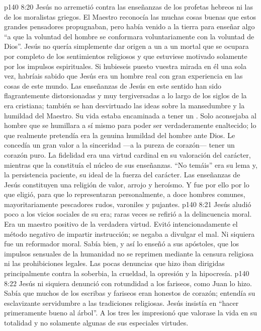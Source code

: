 \vs p140 8:20 Jesús no arremetió contra las enseñanzas de los profetas hebreos ni las de los moralistas griegos. El Maestro reconocía las muchas cosas buenas que estos grandes pensadores propugnaban, pero había venido a la tierra para enseñar algo  “a que la voluntad del hombre se conformara voluntariamente con la voluntad de Dios”. Jesús no quería simplemente dar origen a un  a un mortal que se ocupara por completo de los sentimientos religiosos y que estuviese motivado solamente por los impulsos espirituales. Si hubieseis puesto vuestra mirada en él una sola vez, habríais sabido que Jesús era un hombre real con gran experiencia en las cosas de este mundo. Las enseñanzas de Jesús en este sentido han sido flagrantemente distorsionadas y muy tergiversadas a lo largo de los siglos de la era cristiana; también se han desvirtuado las ideas sobre la mansedumbre y la humildad del Maestro. Su vida estaba encaminada a tener un . Solo aconsejaba al hombre que se humillara a sí mismo para poder ser verdaderamente enaltecido; lo que realmente pretendía era la genuina humildad del hombre ante Dios. Le concedía un gran valor a la sinceridad ---a la pureza de corazón--- tener un corazón puro. La fidelidad era una virtud cardinal en su valoración del carácter, mientras que la  constituía el núcleo de sus enseñanzas. “No temáis” era su lema y, la persistencia paciente, su ideal de la fuerza del carácter. Las enseñanzas de Jesús constituyen una religión de valor, arrojo y heroísmo. Y fue por ello por lo que eligió, para que lo representaran personalmente, a doce hombres comunes, mayoritariamente pescadores rudos, varoniles y pujantes.
\vs p140 8:21 Jesús aludió poco a los vicios sociales de su era; raras veces se refirió a la delincuencia moral. Era un maestro positivo de la verdadera virtud. Evitó intencionadamente el método negativo de impartir instrucción; se negaba a divulgar el mal. Ni siquiera fue un reformador moral. Sabía bien, y así lo enseñó a sus apóstoles, que los impulsos sensuales de la humanidad no se reprimen mediante la censura religiosa ni las prohibiciones legales. Las pocas denuncias que hizo iban dirigidas principalmente contra la soberbia, la crueldad, la opresión y la hipocresía.
\vs p140 8:22 Jesús ni siquiera denunció con rotundidad a los fariseos, como Juan lo hizo. Sabía que muchos de los escribas y fariseos eran honestos de corazón; entendía su esclavizante servidumbre a las tradiciones religiosas. Jesús insistía en “hacer primeramente bueno al árbol”. A los tres les impresionó que valorase la vida en su totalidad y no solamente algunas de sus especiales virtudes.

